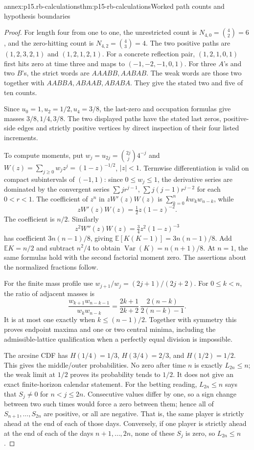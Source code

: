 \begin{annexitem}{annex:p15.rb-calculations}{thm:p15-rb-calculations}{Worked path counts and hypothesis boundaries}
\begin{proof}
For length four from one to one, the unrestricted count is
\(N_{4,0}=\binom42=6\), and the zero-hitting count is
\(N_{4,2}=\binom43=4\).
The two positive paths are
\((1,2,3,2,1)\) and \((1,2,1,2,1)\).
For a concrete reflection pair, \((1,2,1,0,1)\) first hits
zero at time three and maps to \((-1,-2,-1,0,1)\).
For three \(A\)'s and two \(B\)'s, the strict words are
\(AAABB,AABAB\). The weak words are those two together with
\(AABBA,ABAAB,ABABA\).
They give the stated two and five of ten counts.

Since \(u_0=1,u_2=1/2,u_4=3/8\), the last-zero and
occupation formulas give masses \(3/8,1/4,3/8\).
The two displayed paths have the stated last zeros, positive-side
edges and strictly positive vertices by direct inspection of
their four listed increments.

To compute moments, put \(w_j=u_{2j}=\binom{2j}{j}4^{-j}\)
and \(W(z)=\sum_{j\geq0}w_jz^j=(1-z)^{-1/2}\), \(|z|<1\).
Termwise differentiation is valid on compact subintervals of
\((-1,1)\): since \(0\leq w_j\leq1\), the derivative series
are dominated by the convergent series
\(\sum j r^{j-1}\), \(\sum j(j-1)r^{j-2}\) for each \(0<r<1\).
The coefficient of \(z^n\) in \(zW'(z)W(z)\) is
\(\sum_{k=0}^n k w_k w_{n-k}\), while
\[
 zW'(z)W(z)=\tfrac12z(1-z)^{-2}.
 \]
The coefficient is \(n/2\).
Similarly
\[
 z^2W''(z)W(z)=\tfrac34z^2(1-z)^{-3}
 \]
has coefficient \(3n(n-1)/8\), giving
\(\mathbb E[K(K-1)]=3n(n-1)/8\).
Add \(\mathbb EK=n/2\) and subtract \(n^2/4\) to obtain
\(\operatorname{Var}(K)=n(n+1)/8\).
At \(n=1\), the same formulas hold with the second factorial
moment zero. The assertions about the normalized fractions follow.

For the finite mass profile use
\(w_{j+1}/w_j=(2j+1)/(2j+2)\).
For \(0\leq k<n\), the ratio of adjacent masses is
\[
 \frac{w_{k+1}w_{n-k-1}}{w_kw_{n-k}}
 =\frac{2k+1}{2k+2}\,
                  \frac{2(n-k)}{2(n-k)-1}.
 \]
It is at most one exactly when \(k\leq(n-1)/2\).
Together with symmetry this proves endpoint maxima and
one or two central minima, including the admissible-lattice
qualification when a perfectly equal division is impossible.

The arcsine CDF has \(H(1/4)=1/3\), \(H(3/4)=2/3\),
and \(H(1/2)=1/2\).
This gives the middle/outer probabilities.
No zero after time \(n\) is exactly \(L_{2n}\leq n\);
the weak limit at \(1/2\) proves its probability tends to \(1/2\).
It does not give an exact finite-horizon calendar statement.
For the betting reading, \(L_{2n}\leq n\) says that
\(S_j\neq0\) for \(n<j\leq2n\). Consecutive values differ by one,
so a sign change between two such times would force a zero between
them; hence all of \(S_{n+1},\ldots,S_{2n}\) are positive, or all are
negative. That is, the same player is strictly ahead at the end of each
of those days. Conversely, if one player is strictly ahead at the end of
each of the days \(n+1,\ldots,2n\), none of these \(S_j\) is zero, so
\(L_{2n}\leq n\).


\end{proof}
\end{annexitem}
